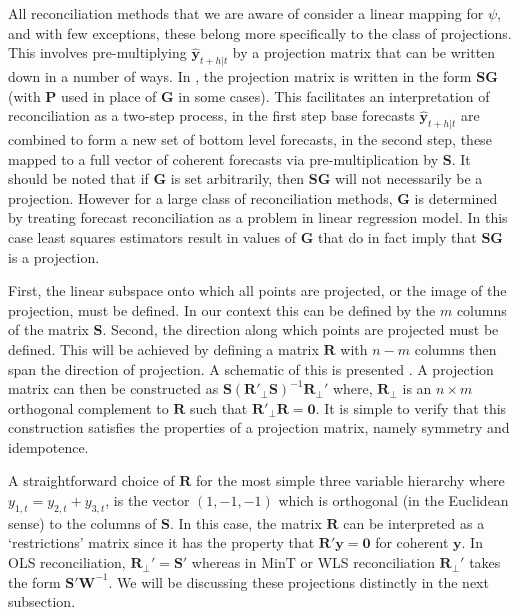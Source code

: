 \documentclass[12pt]{article}
\theoremstyle{definition}
\begin{document}
	All reconciliation methods that we are aware of consider a linear mapping for $\psi$, and with few exceptions, these belong more specifically to the class of projections.  This involves pre-multiplying $\hat{\bm{y}}_{t+h|t}$ by a projection matrix that can be written down in a number of ways.  In , the projection matrix is written in the form $\bm{SG}$ (with $\bm{P}$ used in place of $\bm{G}$ in some cases).  This facilitates an interpretation of reconciliation as a two-step process, in the first step base forecasts $\hat{\bm{y}}_{t+h|t}$ are combined to form a new set of bottom level forecasts, in the second step, these mapped to a full vector of coherent forecasts via pre-multiplication by $\bm{S}$.  It should be noted that if $\bm{G}$ is set arbitrarily, then $\bm{SG}$ will not necessarily be a projection.  However for a large class of reconciliation methods, $\bm{G}$ is determined by treating forecast reconciliation as a problem in linear regression model.  In this case least squares estimators result in values of $\bm{G}$ that do in fact imply that $\bm{SG}$ is a projection.
	
	
    First, the linear subspace onto which all points are projected, or the image of the projection, must be defined. In our context this can be defined by the $m$ columns of the matrix $\bm{S}$.  Second, the direction along which points are projected must be defined.  This will be achieved by defining a matrix $\bm{R}$ with $n-m$ columns then span the direction of projection. A schematic of this is presented .   A projection matrix can then be constructed as $\bm{S}({\bm{R}'_{\perp}}\bm{S})^{-1}\bm{R}_{\perp}'$ where, ${\bm{R}_{\perp}}$ is an $n\times m$ orthogonal complement to $\bm{R}$ such that ${\bm{R}'_{\perp}}\bm{R}=\bm{0}$. It is simple to verify that this construction satisfies the properties of a projection matrix, namely symmetry and idempotence.
	
	A straightforward choice of $\bm{R}$ for the most simple three variable hierarchy where $y_{1,t}=y_{2,t}+y_{3,t}$, is the vector $(1,-1,-1)$ which is orthogonal (in the Euclidean sense) to the columns of $\bm{S}$. In this case, the matrix $\bm{R}$ can be interpreted as a `restrictions' matrix since it has the property that $\bm{R}'\bm{y}=\bm{0}$ for coherent $\bm{y}$. In OLS reconciliation, $\bm{R}_{\perp}'= \bm{S}'$ whereas in MinT or WLS reconciliation $\bm{R}_{\perp}'$ takes the form $\bm{S'W}^{-1}$. We will be discussing these projections distinctly in the next subsection. 
	
\end{document}
